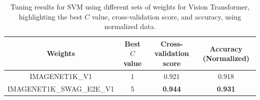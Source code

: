 \begin{table}[H]
    \centering
    \begin{tabular}{@{}cccc@{}}
        \toprule
        \textbf{Weights} & \textbf{Best $C$ value} & \textbf{Cross-validation score} & \textbf{Accuracy (Normalized)} \\
        \midrule \midrule
        IMAGENET1K\_V1           & 1                       & 0.921                           & 0.918             \\
        IMAGENET1K\_SWAG\_E2E\_V1  & 5                       & \textbf{0.944}                  & \textbf{0.931}    \\
        \bottomrule
    \end{tabular}
    \caption{Tuning results for SVM using different sets of weights for Vision Transformer, highlighting the best $C$ value, cross-validation score, and accuracy, using normalized data.}
    \label{tab:vit_svm_tuned}
\end{table}